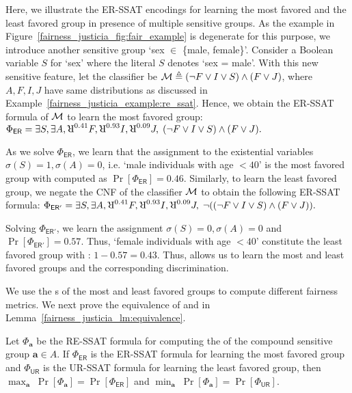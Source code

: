 \begin{example}
	\label{fairness_justicia_example:er_ssat}
	Here, we illustrate the ER-SSAT encodings for learning the most favored and the least favored group in presence of multiple sensitive groups. As the example in Figure~\ref{fairness_justicia_fig:fair_example} is degenerate for this purpose, we introduce another sensitive group `sex $ \in $ \{male, female\}'. Consider a Boolean variable $ S $ for `sex' where the literal $ S $ denotes `sex = male'. With this new sensitive feature, let the classifier be  $\mathcal{M} \triangleq (\neg F \vee I \vee S) \wedge (F \vee J)$, where $ A,F,I,J $ have same distributions as discussed in Example~\ref{fairness_justicia_example:re_ssat}. 
	Hence, we obtain the ER-SSAT formula of $\mathcal{M}$ to learn the most favored group:
	$ \Phi_{\mathsf{ER}} =  \exists S,\exists A, \R^{0.41}F, \R^{0.93}I, \R^{0.09}J, \; (\neg F \vee I \vee S) \wedge (F \vee J).
	$
	
	As we solve $ \Phi_{\mathsf{ER}} $, we learn that the assignment to the existential variables $ \sigma(S) = 1, \sigma(A) = 0$, i.e. `male individuals with age $ < 40 $' is the most favored group with  computed as $ \Pr[\Phi_{\mathsf{ER}}] = 0.46$. Similarly, to learn the least favored group, we negate the CNF of the classifier $\mathcal{M}$ to obtain the following ER-SSAT formula:
	$	\Phi_{\mathsf{ER'}} =  \exists S, \exists A, \R^{0.41}F, \R^{0.93}I, \R^{0.09}J, \; \neg((\neg F \vee I \vee S) \wedge (F \vee J)).
	$
	
	Solving $ \Phi_{\mathsf{ER'}} $, we learn the assignment $ \sigma(S) = 0, \sigma(A) = 0  $ and $  \Pr[\Phi_{\mathsf{ER'}}] = 0.57 $. Thus, `female individuals with age $ < 40 $' constitute the least favored group with :  $ 1-0.57 = 0.43$. 
	Thus, {\justicialearn} allows us to learn the most and least favored groups and the corresponding discrimination.
\end{example}
We use the s of the most and least favored groups to compute different fairness metrics. We next prove the equivalence of {\justiciaenum} and {\justicialearn} in Lemma~\ref{fairness_justicia_lm:equivalence}.
\begin{lemma}
	\label{fairness_justicia_lm:equivalence}
	Let $ \Phi_{\mathbf{a}} $ be the RE-SSAT formula for computing the  of the compound sensitive group $ \mathbf{a} \in A $. If $ \Phi_{\mathsf{ER}} $ is the ER-SSAT formula for learning the most favored group and $ \Phi_{\mathsf{UR}} $ is the UR-SSAT formula for learning the least favored group, then
	$\max_{\mathbf{a}} \; \Pr[\Phi_{\mathbf{a}}] = \Pr[\Phi_{\mathsf{ER}}]$   
	and
	$\min_{\mathbf{a}} \; \Pr[\Phi_{\mathbf{a}}] = \Pr[\Phi_{\mathsf{UR}}]$.   
\end{lemma}
